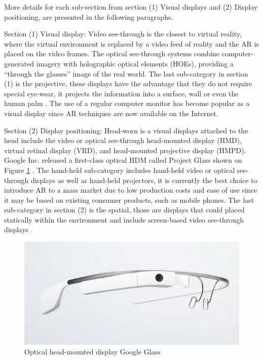 More details for each sub-section from section (1) Visual displays and (2) Display positioning, are presented in the following paragraphs.

Section (1) Visual display: Video see-through is the closest to virtual reality, where the virtual environment is replaced by a video feed of reality and the AR is placed on the video frames. The optical see-through systems combine computer-generated imagery with holographic optical elements (HOEs), providing a ``through the glasses'' image of the real world. The last sub-category in section (1) is the projective, these displays have the advantage that they do not require special eye-wear, it projects the information into a surface, wall or even the human palm \cite{Benford1998}. The use of a regular computer monitor has become popular as a visual display since AR techniques are now available on the Internet.

Section (2) Display positioning: Head-worn is a visual displays attached to the head include the video or optical see-through head-mounted display (HMD), virtual retinal display (VRD), and head-mounted projective display (HMPD). Google Inc. released a first-class optical HDM called Project Glass shown on Figure \ref{figure:google_glass} \cite{Glass2013}. The hand-held sub-category includes hand-held video or optical see-through displays as well as hand-held projectors, it is currently the best choice to introduce AR to a mass market due to low production costs and ease of use since it may be based on existing consumer products, such as mobile phones. The last sub-category in section (2) is the spatial, those are displays that could placed statically within the environment and include screen-based video see-through displays \cite{Benford1998}.

\begin{figure}[!htb]
  \centering
  \includegraphics[width=\linewidth]{chapters/basic_concepts/google_glass.png}
  \caption{Optical head-mounted display Google Glass \cite{Glass2013}}
  \label{figure:google_glass}
\end{figure}

